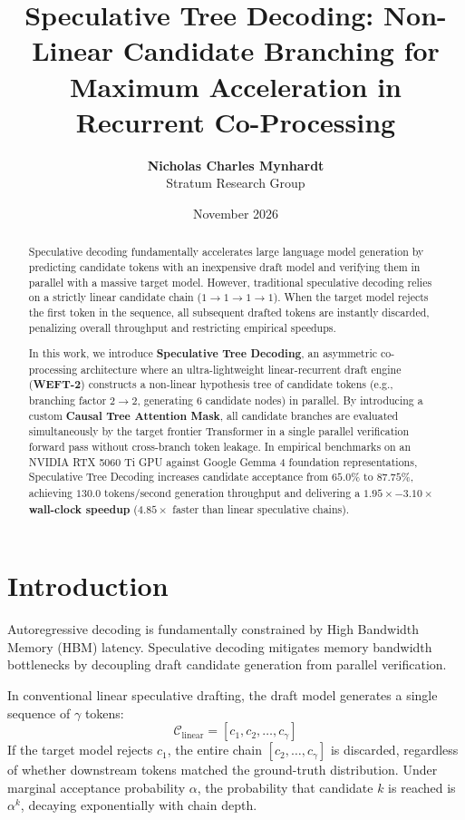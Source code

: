 \documentclass[11pt,a4paper]{article}
\title{\textbf{Speculative Tree Decoding: Non-Linear Candidate Branching for Maximum Acceleration in Recurrent Co-Processing}}
\author{
  \textbf{Nicholas Charles Mynhardt} \\
  Stratum Research Group
}
\date{November 2026}
\begin{document}
\maketitle

\begin{abstract}
Speculative decoding fundamentally accelerates large language model generation by predicting candidate tokens with an inexpensive draft model and verifying them in parallel with a massive target model. However, traditional speculative decoding relies on a strictly linear candidate chain ($1 \to 1 \to 1 \to 1$). When the target model rejects the first token in the sequence, all subsequent drafted tokens are instantly discarded, penalizing overall throughput and restricting empirical speedups.

In this work, we introduce \textbf{Speculative Tree Decoding}, an asymmetric co-processing architecture where an ultra-lightweight linear-recurrent draft engine (\textbf{WEFT-2}) constructs a non-linear hypothesis tree of candidate tokens (e.g., branching factor $2 \to 2$, generating $6$ candidate nodes) in parallel. By introducing a custom \textbf{Causal Tree Attention Mask}, all candidate branches are evaluated simultaneously by the target frontier Transformer in a single parallel verification forward pass without cross-branch token leakage. In empirical benchmarks on an NVIDIA RTX 5060 Ti GPU against Google Gemma 4 foundation representations, Speculative Tree Decoding increases candidate acceptance from $65.0\%$ to \textbf{$87.75\%$}, achieving \textbf{$130.0\text{ tokens/second}$} generation throughput and delivering a \textbf{$1.95\times - 3.10\times$ wall-clock speedup} ($4.85\times$ faster than linear speculative chains).
\end{abstract}

\section{Introduction}
Autoregressive decoding is fundamentally constrained by High Bandwidth Memory (HBM) latency. Speculative decoding mitigates memory bandwidth bottlenecks by decoupling draft candidate generation from parallel verification.

In conventional linear speculative drafting, the draft model generates a single sequence of $\gamma$ tokens:
\begin{equation}
\mathcal{C}_{\text{linear}} = [c_1, c_2, \dots, c_\gamma]
\end{equation}
If the target model rejects $c_1$, the entire chain $[c_2, \dots, c_\gamma]$ is discarded, regardless of whether downstream tokens matched the ground-truth distribution. Under marginal acceptance probability $\alpha$, the probability that candidate $k$ is reached is $\alpha^k$, decaying exponentially with chain depth.
\end{document}
